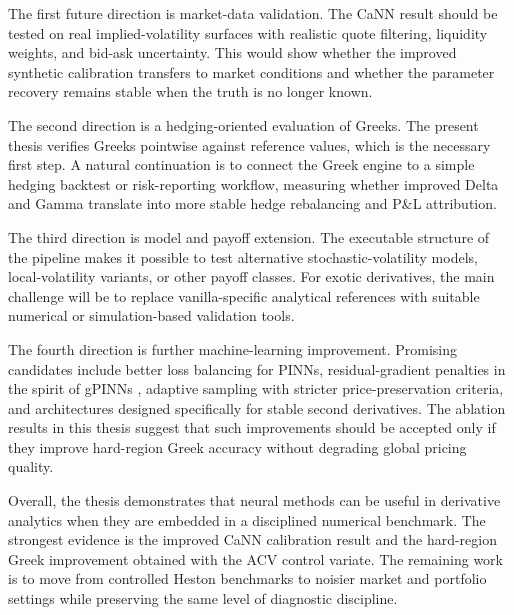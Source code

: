 The first future direction is market-data validation. The CaNN result should be tested on real implied-volatility surfaces with realistic quote filtering, liquidity weights, and bid-ask uncertainty. This would show whether the improved synthetic calibration transfers to market conditions and whether the parameter recovery remains stable when the truth is no longer known.

The second direction is a hedging-oriented evaluation of Greeks. The present thesis verifies Greeks pointwise against reference values, which is the necessary first step. A natural continuation is to connect the Greek engine to a simple hedging backtest or risk-reporting workflow, measuring whether improved Delta and Gamma translate into more stable hedge rebalancing and P\&L attribution.

The third direction is model and payoff extension. The executable structure of the pipeline makes it possible to test alternative stochastic-volatility models, local-volatility variants, or other payoff classes. For exotic derivatives, the main challenge will be to replace vanilla-specific analytical references with suitable numerical or simulation-based validation tools.

The fourth direction is further machine-learning improvement. Promising candidates include better loss balancing for PINNs, residual-gradient penalties in the spirit of gPINNs \cite{yu2022gpinn}, adaptive sampling with stricter price-preservation criteria, and architectures designed specifically for stable second derivatives. The ablation results in this thesis suggest that such improvements should be accepted only if they improve hard-region Greek accuracy without degrading global pricing quality.

Overall, the thesis demonstrates that neural methods can be useful in derivative analytics when they are embedded in a disciplined numerical benchmark. The strongest evidence is the improved CaNN calibration result and the hard-region Greek improvement obtained with the ACV control variate. The remaining work is to move from controlled Heston benchmarks to noisier market and portfolio settings while preserving the same level of diagnostic discipline.
